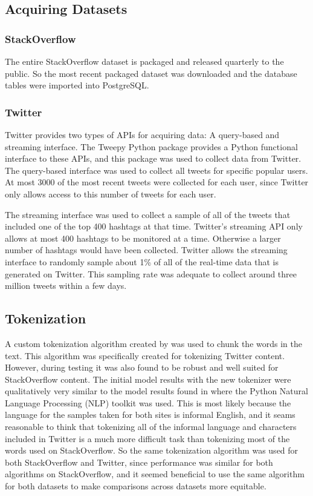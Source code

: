 \documentclass[man,floatsintext,donotrepeattitle]{apa6}
\begin{document}
\subsection{Acquiring Datasets}

\subsubsection{StackOverflow}

The entire StackOverflow dataset is packaged and released quarterly to the public.
So the most recent packaged dataset was downloaded and the database tables were imported into PostgreSQL.

\subsubsection{Twitter}

Twitter provides two types of APIs for acquiring data: A query-based and streaming interface.
The Tweepy Python package provides a Python functional interface to these APIs, and this package was used to collect data from Twitter.
The query-based interface was used to collect all tweets for specific popular users.
At most \num{3000} of the most recent tweets were collected for each user, since Twitter only allows access to this number of tweets for each user.

The streaming interface was used to collect a sample of all of the tweets that included one of the top 400 hashtags at that time.
Twitter's streaming API only allows at most 400 hashtags to be monitored at a time.
Otherwise a larger number of hashtags would have been collected.
Twitter allows the streaming interface to randomly sample about 1\% of all of the real-time data that is generated on Twitter.
This sampling rate was adequate to collect around three million tweets within a few days.

\subsection{Tokenization}

A custom tokenization algorithm created by \textcite{Owoputi2013} was used to chunk the words in the text.
This algorithm was specifically created for tokenizing Twitter content.
However, during testing it was also found to be robust and well suited for StackOverflow content.
The initial model results with the new tokenizer were qualitatively very similar to the model results found in \textcite{Stanley2013} where the Python Natural Language Processing (NLP) toolkit \parencite{Bird2009} was used.
This is most likely because the language for the samples taken for both sites is informal English,
and it seams reasonable to think that tokenizing all of the informal language and characters included in Twitter is a much more difficult task than tokenizing most of the words used on StackOverflow.
So the same tokenization algorithm was used for both StackOverflow and Twitter, since performance was similar for both algorithms on StackOverflow,
and it seemed beneficial to use the same algorithm for both datasets to make comparisons across datasets more equitable.
\end{document}
